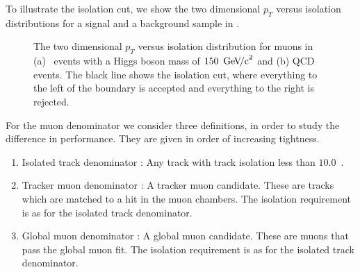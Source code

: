 \documentclass{cmspaper}
\begin{document}
To illustrate the isolation cut, we show the two dimensional $p_T$ versus isolation distributions for a signal and a background sample in .

\begin{figure}[htb]
  \begin{center}
    
    \caption{The two dimensional $p_T$ versus isolation distribution for muons in (a) \HiggsToWW\ events with a Higgs boson mass of $150~\,\mathrm{Ge\kern -0.1em V\!/c}^2$ and (b) QCD events. The black line shows the isolation cut, where everything to the left of the boundary is accepted and everything to the right is rejected.}
    \label{fig:pt_iso_mu_h150ww}
  \end{center}
\end{figure}

For the muon denominator we consider three definitions, in order to study the difference in performance. They are given in order of increasing tightness.

\begin{enumerate}
\item Isolated track denominator : Any track with track isolation less than $10.0$~\GeVc.
\item Tracker muon denominator : A tracker muon candidate. These are tracks which are matched to a hit in the muon chambers. The isolation requirement is as for the isolated track denominator.
\item Global muon denominator : A global muon candidate. These are muons that pass the global muon fit. The isolation requirement is as for the isolated track denominator.
\end{enumerate}
\end{document}
